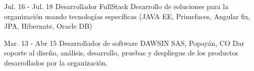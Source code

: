 \documentclass[]{cv-class}
\begin{document}
\begin{entrylist}
	\entry
	{Jul. 16 - Jul. 18}
	{Desarrollador FullStack}
	{ }
	{Desarrollo de soluciones para la organización usando tecnologías específicas (JAVA EE, Primefaces, Angular 6x, JPA, Hibernate, Oracle DB)}
	
	\entry
	{Mar. 13 - Abr 15}
	{Desarrollador de software}
	{DAWSIN SAS, Popayán, CO}
	{Dar soporte al diseño, análisis, desarrollo, pruebas y despliegue de los productos desarrollados por la organización.}
\end{entrylist}
\end{document}
